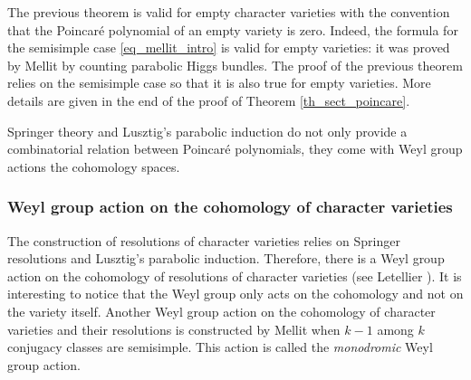 \begin{remark}
The previous theorem is valid for empty character varieties with the convention that the Poincaré polynomial of an empty variety is zero. Indeed, the formula for the semisimple case \eqref{eq_mellit_intro} is valid for empty varieties: it was proved by Mellit by counting parabolic Higgs bundles. The proof of the previous theorem relies on the semisimple case so that it is also true for empty varieties. More details are given in the end of the proof of Theorem \ref{th_sect_poincare}.
\end{remark}

Springer theory and Lusztig's parabolic induction do not only provide a combinatorial relation between Poincaré polynomials, they come with Weyl group actions the cohomology spaces.

\subsubsection{Weyl group action on the cohomology of character varieties}
The construction of resolutions of character varieties relies on Springer resolutions and Lusztig's parabolic induction. Therefore, there is a Weyl group action on the cohomology of resolutions of character varieties (see Letellier \cite{Letellier13}). It is interesting to notice that the Weyl group only acts on the cohomology and not on the variety itself. Another Weyl group action on the cohomology of character varieties and their resolutions is constructed by Mellit \cite{Mellit2019} when $k-1$ among $k$ conjugacy classes are semisimple. This action is called the \textit{monodromic} Weyl group action.

